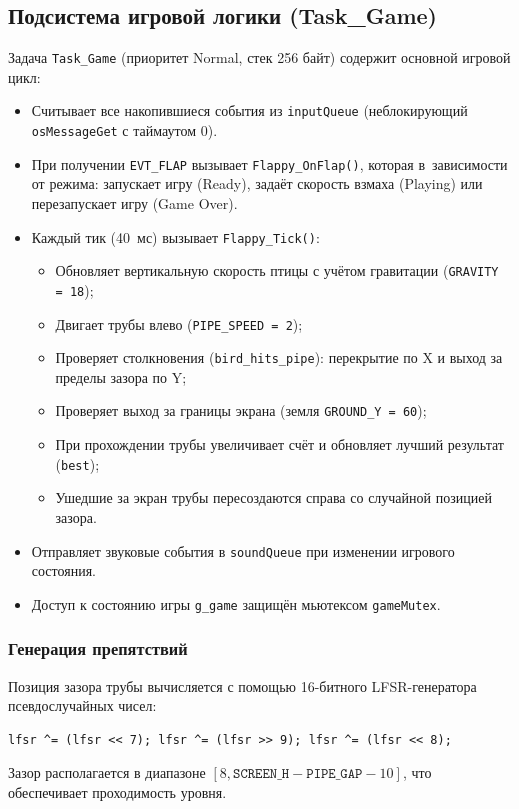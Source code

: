 \documentclass[a4paper,12pt]{article}
\begin{document}
\subsection{Подсистема игровой логики (Task\_Game)}


Задача \texttt{Task\_Game} (приоритет Normal, стек 256 байт) содержит основной игровой цикл:
\begin{itemize}
    \item Считывает все накопившиеся события из \texttt{inputQueue} (неблокирующий \texttt{osMessageGet} с таймаутом 0).
    \item При получении \texttt{EVT\_FLAP} вызывает \texttt{Flappy\_OnFlap()}, которая в~зависимости от режима: запускает игру (Ready), задаёт скорость взмаха (Playing) или перезапускает игру (Game Over).
    \item Каждый тик (40~мс) вызывает \texttt{Flappy\_Tick()}:
        \begin{itemize}
            \item Обновляет вертикальную скорость птицы с учётом гравитации (\texttt{GRAVITY = 18});
            \item Двигает трубы влево (\texttt{PIPE\_SPEED = 2});
            \item Проверяет столкновения (\texttt{bird\_hits\_pipe}): перекрытие по X и выход за пределы зазора по Y;
            \item Проверяет выход за границы экрана (земля \texttt{GROUND\_Y = 60});
            \item При прохождении трубы увеличивает счёт и обновляет лучший результат (\texttt{best});
            \item Ушедшие за экран трубы пересоздаются справа со случайной позицией зазора.
        \end{itemize}
    \item Отправляет звуковые события в \texttt{soundQueue} при изменении игрового состояния.
    \item Доступ к состоянию игры \texttt{g\_game} защищён мьютексом \texttt{gameMutex}.
\end{itemize}


\subsubsection{Генерация препятствий}

Позиция зазора трубы вычисляется с помощью 16-битного LFSR-генератора псевдослучайных чисел:
\begin{verbatim}
lfsr ^= (lfsr << 7); lfsr ^= (lfsr >> 9); lfsr ^= (lfsr << 8);
\end{verbatim}
Зазор располагается в диапазоне $[8, \texttt{SCREEN\_H} - \texttt{PIPE\_GAP} - 10]$, что обеспечивает проходимость уровня.
\end{document}
